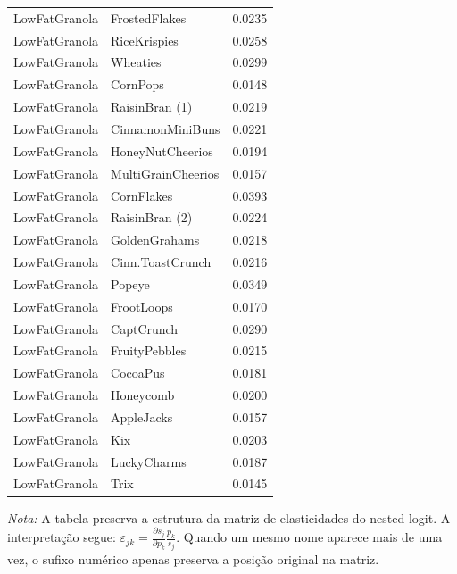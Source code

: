 \begin{table}[H]
\begin{tabular}{llr}
LowFatGranola & FrostedFlakes & 0.0235 \\
LowFatGranola & RiceKrispies & 0.0258 \\
LowFatGranola & Wheaties & 0.0299 \\
LowFatGranola & CornPops & 0.0148 \\
LowFatGranola & RaisinBran (1) & 0.0219 \\
LowFatGranola & CinnamonMiniBuns & 0.0221 \\
LowFatGranola & HoneyNutCheerios & 0.0194 \\
LowFatGranola & MultiGrainCheerios & 0.0157 \\
LowFatGranola & CornFlakes & 0.0393 \\
LowFatGranola & RaisinBran (2) & 0.0224 \\
LowFatGranola & GoldenGrahams & 0.0218 \\
LowFatGranola & Cinn.ToastCrunch & 0.0216 \\
LowFatGranola & Popeye & 0.0349 \\
LowFatGranola & FrootLoops & 0.0170 \\
LowFatGranola & CaptCrunch & 0.0290 \\
LowFatGranola & FruityPebbles & 0.0215 \\
LowFatGranola & CocoaPus & 0.0181 \\
LowFatGranola & Honeycomb & 0.0200 \\
LowFatGranola & AppleJacks & 0.0157 \\
LowFatGranola & Kix & 0.0203 \\
LowFatGranola & LuckyCharms & 0.0187 \\
LowFatGranola & Trix & 0.0145 \\
\bottomrule
\end{tabular}

\vspace{0.3em}
\footnotesize
\textit{Nota:} A tabela preserva a estrutura da matriz de elasticidades do nested logit. A interpretação segue: $\varepsilon_{jk}=\frac{\partial s_j}{\partial p_k}\frac{p_k}{s_j}$. Quando um mesmo nome aparece mais de uma vez, o sufixo numérico apenas preserva a posição original na matriz.
\end{table}
\endgroup


